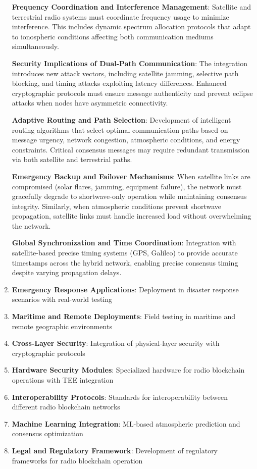 \documentclass[11pt,a4paper]{article}
\begin{document}
\begin{enumerate}
\textbf{Frequency Coordination and Interference Management}: Satellite and terrestrial radio systems must coordinate frequency usage to minimize interference. This includes dynamic spectrum allocation protocols that adapt to ionospheric conditions affecting both communication mediums simultaneously.

\textbf{Security Implications of Dual-Path Communication}: The integration introduces new attack vectors, including satellite jamming, selective path blocking, and timing attacks exploiting latency differences. Enhanced cryptographic protocols must ensure message authenticity and prevent eclipse attacks when nodes have asymmetric connectivity.

\textbf{Adaptive Routing and Path Selection}: Development of intelligent routing algorithms that select optimal communication paths based on message urgency, network congestion, atmospheric conditions, and energy constraints. Critical consensus messages may require redundant transmission via both satellite and terrestrial paths.

\textbf{Emergency Backup and Failover Mechanisms}: When satellite links are compromised (solar flares, jamming, equipment failure), the network must gracefully degrade to shortwave-only operation while maintaining consensus integrity. Similarly, when atmospheric conditions prevent shortwave propagation, satellite links must handle increased load without overwhelming the network.

\textbf{Global Synchronization and Time Coordination}: Integration with satellite-based precise timing systems (GPS, Galileo) to provide accurate timestamps across the hybrid network, enabling precise consensus timing despite varying propagation delays.
\item \textbf{Emergency Response Applications}: Deployment in disaster response scenarios with real-world testing
\item \textbf{Maritime and Remote Deployments}: Field testing in maritime and remote geographic environments
\item \textbf{Cross-Layer Security}: Integration of physical-layer security with cryptographic protocols
\item \textbf{Hardware Security Modules}: Specialized hardware for radio blockchain operations with TEE integration
\item \textbf{Interoperability Protocols}: Standards for interoperability between different radio blockchain networks
\item \textbf{Machine Learning Integration}: ML-based atmospheric prediction and consensus optimization
\item \textbf{Legal and Regulatory Framework}: Development of regulatory frameworks for radio blockchain operation
\end{enumerate}
\end{document}
